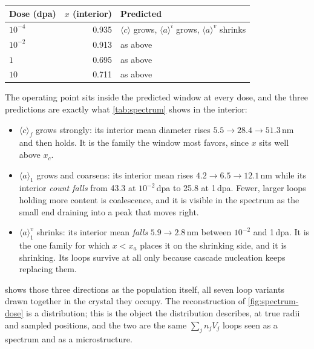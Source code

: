 \begin{center}
\begin{tabular}{@{}lrl@{}}
\toprule
Dose (dpa) & $x$ (interior) & Predicted \\
\midrule
$10^{-4}$ & 0.935 & $\langle c\rangle$ grows, $\langle a\rangle^{i}$ grows,
                    $\langle a\rangle^{v}$ shrinks \\
$10^{-2}$ & 0.913 & as above \\
$1$       & 0.695 & as above \\
$10$      & 0.711 & as above \\
\bottomrule
\end{tabular}
\end{center}

The operating point sits inside the predicted window at every dose,
and the three predictions are exactly what \cref{tab:spectrum} shows in the
interior:

\begin{itemize}[itemsep=3pt]
\item $\langle c\rangle_f$ grows strongly: its interior mean diameter
      rises $5.5\to28.4\to51.3\,$nm and then holds. It is the family the window
      most favors, since $x$ sits well above $x_c$.
\item $\langle a\rangle_1$ grows and coarsens: its interior mean rises
      $4.2\to6.5\to12.1\,$nm while its interior \emph{count falls} from 43.3 at
      $10^{-2}\,$dpa to 25.8 at 1\,dpa. Fewer, larger loops holding more content
      is coalescence, and it is visible in the spectrum as the small end
      draining into a peak that moves right.
\item $\langle a\rangle_1^{v}$ shrinks: its interior mean \emph{falls}
      $5.9\to2.8\,$nm between $10^{-2}$ and 1\,dpa. It is the one family for
      which $x<x_a$ places it on the shrinking side, and it is shrinking. Its
      loops survive at all only because cascade nucleation keeps replacing them.
\end{itemize}

 shows those three directions as the population itself, all
seven loop variants drawn together in the crystal they occupy. The reconstruction
of \cref{fig:spectrum-dose} is a distribution; this is the object the
distribution describes, at true radii and sampled positions, and the two are the
same $\sum_j n_jV_j$ loops seen as a spectrum and as a microstructure.


